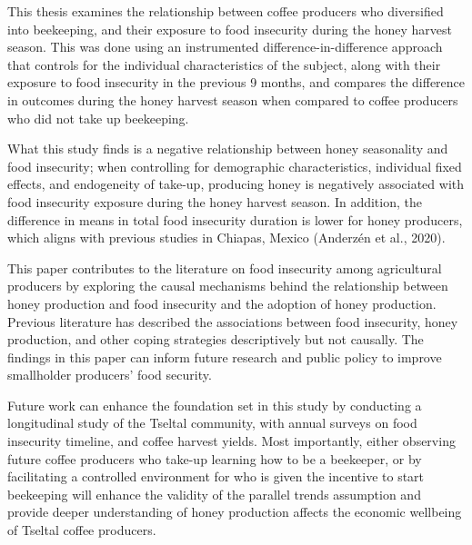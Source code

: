 \documentclass[../main.tex]{subfiles}
\begin{document}
This thesis examines the relationship between coffee producers who diversified into beekeeping, and their exposure to food insecurity during the honey harvest season. This was done using an instrumented difference-in-difference approach that controls for the individual characteristics of the subject, along with their exposure to food insecurity in the previous 9 months, and compares the difference in outcomes during the honey harvest season when compared to coffee producers who did not take up beekeeping. 

What this study finds is a negative relationship between honey seasonality and food insecurity; when controlling for demographic characteristics, individual fixed effects, and endogeneity of take-up, producing honey is negatively associated with food insecurity exposure during the honey harvest season. In addition, the difference in means in total food insecurity duration is lower for honey producers, which aligns with previous studies in Chiapas, Mexico (Anderzén et al., 2020).

This paper contributes to the literature on food insecurity among agricultural producers by exploring the causal mechanisms behind the relationship between honey production and food insecurity and the adoption of honey production. Previous literature has described the associations between food insecurity, honey production, and other coping strategies descriptively but not causally. The findings in this paper can inform future research and public policy to improve smallholder producers’ food security.

Future work can enhance the foundation set in this study by conducting a longitudinal study of the Tseltal community, with annual surveys on food insecurity timeline, and coffee harvest yields. Most importantly, either observing future coffee producers who take-up learning how to be a beekeeper, or by facilitating a controlled environment for who is given the incentive to start beekeeping will enhance the validity of the parallel trends assumption and provide deeper understanding of honey production affects the economic wellbeing of Tseltal coffee producers.
\end{document}
